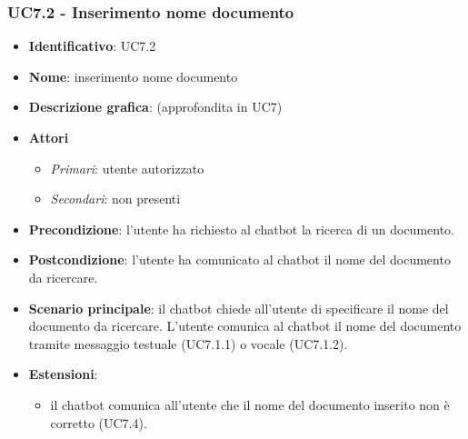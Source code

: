 \subsubsection{UC7.2 - Inserimento nome documento}
\begin{itemize}
    \item \textbf{Identificativo}: UC7.2
    \item \textbf{Nome}: inserimento nome documento
    \item \textbf{Descrizione grafica}: (approfondita in UC7)
    \item \textbf{Attori}
 \begin{itemize} 
    \item \textit{Primari}: utente autorizzato
    \item \textit{Secondari}: non presenti
 \end{itemize}
 \item \textbf{Precondizione}: l'utente ha richiesto al chatbot la ricerca di un documento.
 \item \textbf{Postcondizione}:  l'utente ha comunicato al chatbot il nome del documento da ricercare.
 \item \textbf{Scenario principale}: il chatbot chiede all'utente di specificare il nome del documento da ricercare. L'utente comunica al chatbot il nome del documento tramite messaggio testuale (UC7.1.1) o vocale (UC7.1.2).
 \item \textbf{Estensioni}: 
\begin{itemize} 
    \item il chatbot comunica all'utente che il nome del documento inserito non è corretto (UC7.4).
 \end{itemize}
\end{itemize}


